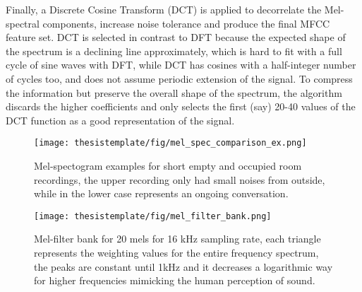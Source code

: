Finally, a Discrete Cosine Transform (DCT) is applied to decorrelate the Mel-spectral components, increase noise tolerance and produce the final MFCC feature set. DCT is selected in contrast to DFT because the expected shape of the spectrum is a declining line approximately, which is hard to fit with a full cycle of sine waves with DFT, while DCT has cosines with a half-integer number of cycles too, and does not assume periodic extension of the signal. To compress the information but preserve the overall shape of the spectrum, the algorithm discards the higher coefficients and only selects the first (say) 20-40 values of the DCT function as a good representation of the signal.




\begin{figure}[ht]
  \begin{center}
    \texttt{[image: thesistemplate/fig/mel\_spec\_comparison\_ex.png]}
    \caption{Mel-spectogram examples for short empty and occupied room recordings, the upper recording only had small noises from outside, while in the lower case represents an ongoing conversation.}
    \label{fig:mel_comp}
  \end{center}
\end{figure}


\begin{figure}[ht]
  \begin{center}
    \texttt{[image: thesistemplate/fig/mel\_filter\_bank.png]}
    \caption{Mel-filter bank for 20 mels for 16 kHz sampling rate, each triangle represents the weighting values for the entire frequency spectrum, the peaks are constant until 1kHz and it decreases a logarithmic way for higher frequencies mimicking the human perception of sound.}
    \label{fig:mel_filter_bank}
  \end{center}
\end{figure}



 




